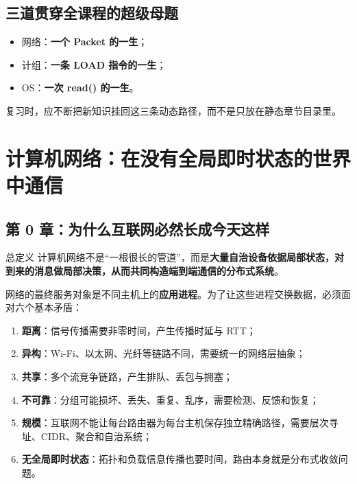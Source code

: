 \documentclass[11pt,a4paper,openany]{ctexbook}
\newcommand{\key}[1]{\textbf{\color{deep}#1}}
\begin{document}
\section{三道贯穿全课程的超级母题}
\begin{itemize}
  \item 网络：\key{一个 Packet 的一生}；
  \item 计组：\key{一条 LOAD 指令的一生}；
  \item OS：\key{一次 read() 的一生}。
\end{itemize}
复习时，应不断把新知识挂回这三条动态路径，而不是只放在静态章节目录里。

\chapter{计算机网络：在没有全局即时状态的世界中通信}

\section{第 0 章：为什么互联网必然长成今天这样}

\begin{corebox}{总定义}
计算机网络不是“一根很长的管道”，而是\textbf{大量自治设备依据局部状态，对到来的消息做局部决策，从而共同构造端到端通信的分布式系统}。
\end{corebox}

网络的最终服务对象是不同主机上的\key{应用进程}。为了让这些进程交换数据，必须面对六个基本矛盾：
\begin{enumerate}
  \item \key{距离}：信号传播需要非零时间，产生传播时延与 RTT；
  \item \key{异构}：Wi-Fi、以太网、光纤等链路不同，需要统一的网络层抽象；
  \item \key{共享}：多个流竞争链路，产生排队、丢包与拥塞；
  \item \key{不可靠}：分组可能损坏、丢失、重复、乱序，需要检测、反馈和恢复；
  \item \key{规模}：互联网不能让每台路由器为每台主机保存独立精确路径，需要层次寻址、CIDR、聚合和自治系统；
  \item \key{无全局即时状态}：拓扑和负载信息传播也要时间，路由本身就是分布式收敛问题。
\end{enumerate}
\end{document}
